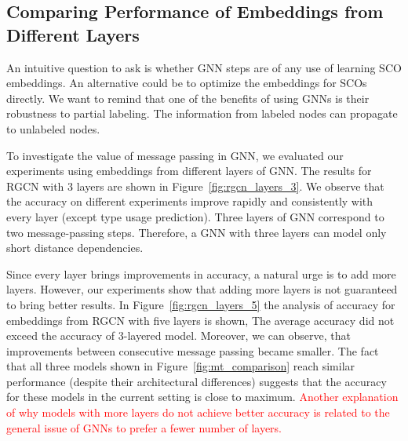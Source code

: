 \documentclass[a4paper,twoside]{article}
\begin{document}
\subsection{Comparing Performance of Embeddings from Different Layers}

An intuitive question to ask is whether GNN steps are of any use of learning SCO embeddings. An alternative could be to optimize the embeddings for SCOs directly. We want to remind that one of the benefits of using GNNs is their robustness to partial labeling. The information from labeled nodes can propagate to unlabeled nodes. 

To investigate the value of message passing in GNN, we evaluated our experiments using embeddings from different layers of GNN\@. The results for RGCN with 3 layers are shown in Figure~\ref{fig:rgcn_layers_3}. We observe that the accuracy on different experiments improve rapidly and consistently with every layer (except type usage prediction). Three layers of GNN correspond to two message-passing steps. Therefore, a GNN with three layers can model only short distance dependencies.

Since every layer brings improvements in accuracy, a natural urge is to add more layers. However, our experiments show that adding more layers is not guaranteed to bring better results. In Figure~\ref{fig:rgcn_layers_5} the analysis of accuracy for embeddings from RGCN with five layers is shown, The average accuracy did not exceed the accuracy of 3-layered model. Moreover, we can observe, that improvements between consecutive message passing became smaller. The fact that all three models shown in Figure~\ref{fig:mt_comparison} reach similar performance (despite their architectural differences) suggests that the accuracy for these models in the current setting is close to maximum. \textcolor{red}{Another explanation of why models with more layers do not achieve better accuracy is related to the general issue of GNNs to prefer a fewer number of layers.}
\end{document}
